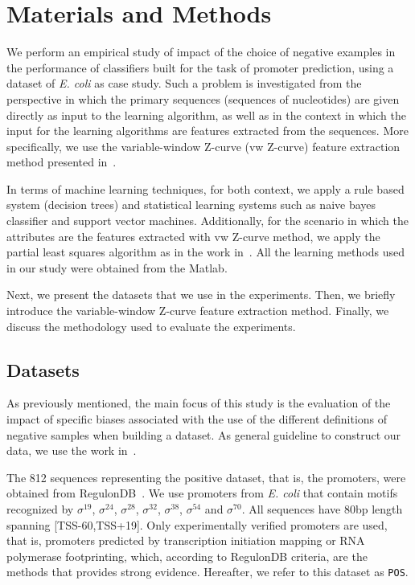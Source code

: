 \documentclass{sig-alternate}
\theoremstyle{plain}
\begin{document}
\section{Materials and Methods}
\label{sec:methods}

We perform an empirical study of impact of the choice of negative examples in the performance of  classifiers built for the task of   promoter prediction, using a dataset of  {\it E. coli} as case study.  Such a problem is investigated from the perspective in which the primary sequences (sequences of nucleotides) are given directly as input to the learning algorithm, as well as in the context in which the input for the learning algorithms are features extracted from the sequences. More specifically, we use the variable-window Z-curve (vw Z-curve) feature extraction method presented in~\cite{song2011a}.

In terms of machine learning techniques, for both context, we apply  a rule based system (decision trees) and statistical learning systems such as naive bayes classifier and  support vector machines.  Additionally, for the scenario in which the attributes are the features extracted with  vw Z-curve  method, we apply the partial least squares algorithm as in the work in~\cite{song2011a}.  All the learning methods used in our study were obtained from the Matlab.

Next, we present the datasets that we use in the experiments. Then, we briefly introduce the variable-window Z-curve feature extraction method. Finally, we discuss the methodology used to evaluate the experiments.

\subsection{Datasets}

As previously mentioned, the main focus  of this study is the evaluation of the impact of specific biases associated with  the use of the different definitions  of negative samples when building a dataset. As general guideline to construct our data, we use the work in~\cite{gordon2003}. 

The 812 sequences representing the positive dataset, that is, the promoters, were obtained from RegulonDB~\cite{gama2008}. We use promoters from {\it E. coli} that contain motifs recognized by ${\sigma }^{{19}}$, ${\sigma }^{{24}}$, ${\sigma }^{{28}}$, ${\sigma }^{{32}}$, ${\sigma }^{{38}}$, ${\sigma }^{{54}}$ and ${\sigma }^{{70}}$. All sequences have 80bp length spanning [TSS-60,TSS+19]. Only experimentally verified promoters are used, that is,  promoters predicted by transcription initiation mapping or RNA polymerase footprinting, which, according to RegulonDB criteria, are the methods that provides strong evidence. Hereafter, we refer to this dataset as {\tt POS}.
\end{document}
